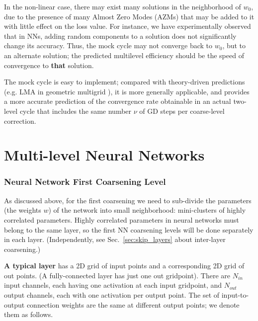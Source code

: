 \documentclass{article} %
\begin{document}
In the non-linear case, there may exist many solutions in the neighborhood of $w_0$, due to the presence of many Almost Zero Modes (AZMs) that may be added to it with little effect on the loss value. For instance, we have experimentally observed that in NNs, adding random components to a solution does not significantly change its accuracy. Thus, the mock cycle may not converge back to $w_0$, but to an alternate solution; the predicted multilevel efficiency should be the speed of convergence to \textbf{that} solution.

The mock cycle is easy to implement; compared with theory-driven predictions (e.g. LMA in geometric multigrid \cite[Sec.~2.1]{guide}), it is more generally applicable, and provides a more accurate prediction of the convergence rate obtainable in an actual two-level cycle that includes the same number $\nu$ of GD steps per coarse-level correction.


\newpage
\part{Multi-level Neural Networks}
\label{sec:nn}

\section{Neural Network First Coarsening Level}
\label{sec:nn_coarse1}

As discussed above, for the first coarsening we need to sub-divide the parameters (the weights $w$) of the network into small neighborhood: mini-clusters of highly correlated parameters. Highly correlated parameters in neural networks must belong to the same layer, so the first NN coarsening levels will be done separately in each layer. (Independently, see Sec.~\ref{sec:skip_layers} about inter-layer coarsening.)

\textbf{A typical layer} has a 2D grid of input points and a corresponding 2D grid of out points. (A fully-connected layer has just one out gridpoint). There are $N_{in}$ input channels, each having one activation at each input gridpoint, and $N_{out}$ output channels, each with one activation per output point. The set of input-to-output connection weights are the same at different output points; we denote them as follows.
\end{document}
